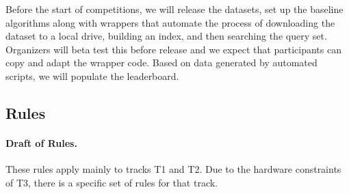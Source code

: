 Before the start of competitions, we will release the datasets, set up
the baseline algorithms along with wrappers that automate the process
of downloading the dataset to a local drive, building an index, and
then searching the query set. Organizers will beta test this before
release and we expect that participants can copy and adapt the wrapper
code.  Based on data generated by automated scripts, we will populate
the leaderboard.


\subsection{Rules}



\paragraph{Draft of Rules.} 

These rules apply mainly to tracks T1 and T2. 
Due to the hardware constraints of T3, there is a specific set of rules for that track.

